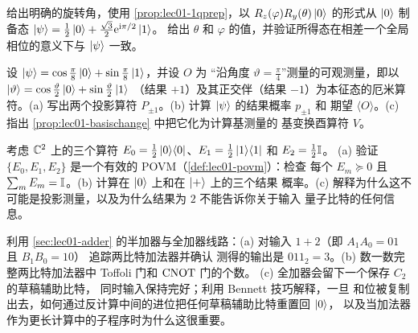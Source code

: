 \begin{exercise}\label{ex:lec01-13}
给出明确的旋转角，使用 \cref{prop:lec01-1qprep}，以
$R_{z}(\varphi)R_{y}(\theta)\ket{0}$ 的形式从 $\ket{0}$ 制备态
$\ket{\psi}=\tfrac{1}{2}\ket{0}+\tfrac{\sqrt3}{2}\mathrm{e}^{\mathrm{i}\pi/2}\ket{1}$。
给出 $\theta$ 和 $\varphi$ 的值，并验证所得态在相差一个全局相位的意义下与
$\ket{\psi}$ 一致。
\end{exercise}

\begin{exercise}\label{ex:lec01-14}
设 $\ket{\psi}=\cos\tfrac{\pi}{8}\ket{0}+\sin\tfrac{\pi}{8}\ket{1}$，并设 $O$ 为
“沿角度 $\vartheta=\tfrac{\pi}{4}$”测量的可观测量，即以
$\ket{\vartheta}=\cos\tfrac{\vartheta}{2}\ket{0}+\sin\tfrac{\vartheta}{2}\ket{1}$
（结果 $+1$）及其正交伴（结果 $-1$）为本征态的厄米算符。(a) 写出两个投影算符
$P_{\pm1}$。(b) 计算 $\ket{\psi}$ 的结果概率 $p_{\pm1}$ 和
期望 $\langle O\rangle$。(c) 指出 \cref{prop:lec01-basischange} 中把它化为计算基测量的
基变换酉算符 $V$。
\end{exercise}

\begin{exercise}\label{ex:lec01-15}
考虑 $\mathbb{C}^{2}$ 上的三个算符
$E_{0}=\tfrac12\ket{0}\!\bra{0}$、$E_{1}=\tfrac12\ket{1}\!\bra{1}$ 和 $E_{2}=\tfrac12\mathbb{I}$。
(a) 验证 $\{E_{0},E_{1},E_{2}\}$ 是一个有效的 POVM（\cref{def:lec01-povm}）：检查
每个 $E_{m}\succeq0$ 且 $\sum_{m}E_{m}=\mathbb{I}$。(b) 计算在 $\ket{0}$ 上和在 $\ket{+}$ 上的三个结果
概率。(c) 解释为什么这不可能是投影测量，以及为什么结果为 $2$ 不能告诉你关于输入
量子比特的任何信息。
\end{exercise}

\begin{exercise}\label{ex:lec01-adder}
利用 \cref{sec:lec01-adder} 的半加器与全加器线路：(a) 对输入 $1+2$（即 $A_1A_0=01$ 且 $B_1B_0=10$）
追踪两比特加法器并确认
测得的输出是 $011_2=3$。(b) 数一数完整两比特加法器中 Toffoli 门和 $\mathrm{CNOT}$ 门的个数。
(c) 全加器会留下一个保存 $C_2$ 的草稿辅助比特，
同时输入保持完好；利用 Bennett 技巧解释，一旦
和位被复制出去，如何通过反计算中间的进位把任何草稿辅助比特重置回 $\ket{0}$，
以及当加法器作为更长计算中的子程序时为什么这很重要。
\end{exercise}

